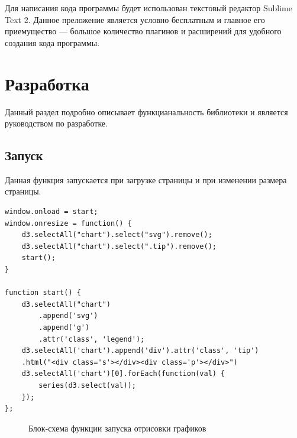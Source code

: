 \documentclass[a4paper,14pt]{extreport}
\begin{document}
\hspace{4ex}Для написания кода программы будет использован текстовый редактор Sublime Text 2. Данное преложение является условно бесплатным и главное его приемущество --- большое количество плагинов и расширений для удобного создания кода программы.
\section{Разработка}
\hspace{4ex}Данный раздел подробно описывает функцианальность библиотеки и является руководством по разработке.
\subsection{Запуск}
\hspace{4ex}Данная функция запускается при загрузке страницы и при изменении размера страницы.
\begin{verbatim}
window.onload = start;
window.onresize = function() {
    d3.selectAll("chart").select("svg").remove();
    d3.selectAll("chart").select(".tip").remove();
    start();
}

function start() {
    d3.selectAll("chart")
        .append('svg')
        .append('g')
        .attr('class', 'legend');
    d3.selectAll('chart').append('div').attr('class', 'tip')
    .html("<div class='s'></div><div class='p'></div>")
    d3.selectAll('chart')[0].forEach(function(val) {
        series(d3.select(val));
    });
};
\end{verbatim}
\begin{figure}[h]
\caption{Блок-схема функции запуска отрисовки графиков}
\label{ris:image}
\end{figure}
\end{document}
